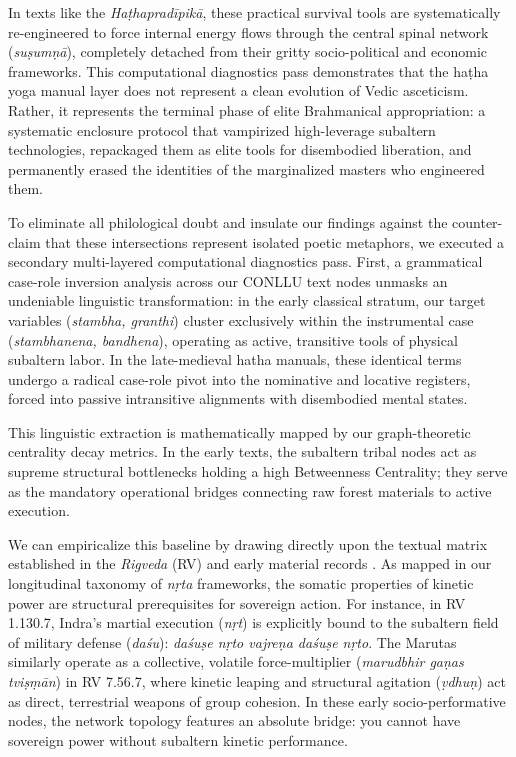 \documentclass[11pt,twoside,letterpaper]{article}
\begin{document}
In texts like the \textit{Haṭhapradīpikā}, these practical survival tools are systematically re-engineered to force internal energy flows through the central spinal network (\textit{suṣumṇā}), completely detached from their gritty socio-political and economic frameworks. This computational diagnostics pass demonstrates that the haṭha yoga manual layer does not represent a clean evolution of Vedic asceticism. Rather, it represents the terminal phase of elite Brahmanical appropriation: a systematic enclosure protocol that vampirized high-leverage subaltern technologies, repackaged them as elite tools for disembodied liberation, and permanently erased the identities of the marginalized masters who engineered them.

To eliminate all philological doubt and insulate our findings against the counter-claim that these intersections represent isolated poetic metaphors, we executed a secondary multi-layered computational diagnostics pass. First, a grammatical case-role inversion analysis across our CONLLU text nodes unmasks an undeniable linguistic transformation: in the early classical stratum, our target variables (\textit{stambha, granthi}) cluster exclusively within the instrumental case (\textit{stambhanena, bandhena}), operating as active, transitive tools of physical subaltern labor. In the late-medieval hatha manuals, these identical terms undergo a radical case-role pivot into the nominative and locative registers, forced into passive intransitive alignments with disembodied mental states. 

This linguistic extraction is mathematically mapped by our graph-theoretic centrality decay metrics. In the early texts, the subaltern tribal nodes act as supreme structural bottlenecks holding a high Betweenness Centrality; they serve as the mandatory operational bridges connecting raw forest materials to active execution. 

We can empiricalize this baseline by drawing directly upon the textual matrix established in the \textit{Rigveda} (RV) and early material records \citep{McCartney2026}. As mapped in our longitudinal taxonomy of \textit{nṛta} frameworks, the somatic properties of kinetic power are structural prerequisites for sovereign action. For instance, in RV 1.130.7, Indra's martial execution (\textit{nṛt}) is explicitly bound to the subaltern field of military defense (\textit{daśu}): \textit{daśuṣe nṛto vajreṇa daśuṣe nṛto}. The Marutas similarly operate as a collective, volatile force-multiplier (\textit{marudbhir gaṇas tviṣṃān}) in RV 7.56.7, where kinetic leaping and structural agitation (\textit{ṿdhuṇ}) act as direct, terrestrial weapons of group cohesion. In these early socio-performative nodes, the network topology features an absolute bridge: you cannot have sovereign power without subaltern kinetic performance.
\end{document}
